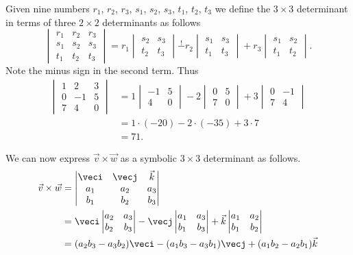 Given nine numbers $r_1$, $r_2$, $r_3$, $s_1$, $s_2$, $s_3$, $t_1$, $t_2$, $t_3$ we define the $3 \times 3$ determinant in terms of three $2 \times 2$ determinants as follows
\[
\begin{vmatrix}r_1 & r_2 & r_3 \\s_1 & s_2 & s_3 \\t_1 & t_2 & t_3\end{vmatrix} 
=
r_1 \begin{vmatrix}s_2 & s_3 \\t_2 & t_3\end{vmatrix}
\stackrel{!}{-}r_2 \begin{vmatrix}s_1 & s_3 \\t_1 & t_3\end{vmatrix}
+r_3 \begin{vmatrix}s_1 & s_2 \\t_1 & t_2\end{vmatrix}.
\]
Note the minus sign in the second term.  Thus
\begin{align*}
\begin{vmatrix}1 & 2 & 3 \\0 & -1 & 5 \\7 & 4 & 0\end{vmatrix} 
& =
1 \begin{vmatrix}-1 & 5 \\4 & 0\end{vmatrix}
-2 \begin{vmatrix}0 & 5 \\7 & 0\end{vmatrix}
+3 \begin{vmatrix}0 & -1 \\7 & 4\end{vmatrix} \\
& = 1 \cdot (-20) - 2 \cdot (-35) + 3 \cdot 7 \\
& = 71.
\end{align*}

We can now express $\vec{v} \times \vec{w}$ as a symbolic $3 \times 3$ determinant as follows.
\begin{align*}
\vec{v} \times \vec{w} & =
\begin{vmatrix}
\veci & \vecj & \vec{k} \\
a_1 & a_2 & a_3 \\
b_1 & b_2 & b_3 
\end{vmatrix} \\
& =
\veci \begin{vmatrix}a_2 & a_3 \\b_2 & b_3\end{vmatrix}
-\vecj \begin{vmatrix}a_1 & a_3 \\b_1 & b_3\end{vmatrix}
+\vec{k} \begin{vmatrix}a_1 & a_2 \\b_1 & b_2\end{vmatrix} \\
& = (a_2 b_3 - a_3 b_2) \veci
- (a_1 b_3 - a_3 b_1) \vecj
+ (a_1 b_2 - a_2 b_1) \vec{k}
\end{align*}

